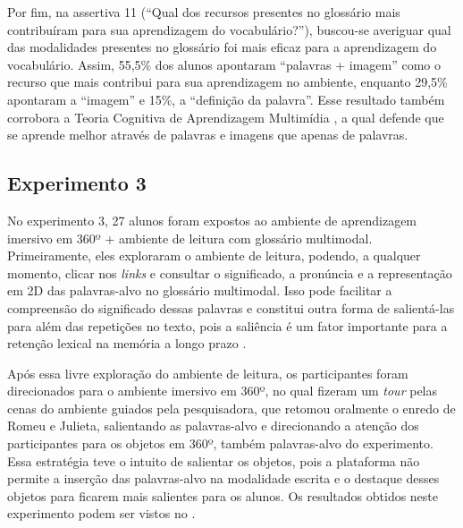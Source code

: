 Por fim, na assertiva 11 (``Qual dos recursos presentes no glossário
mais contribuíram para sua aprendizagem do vocabulário?''), buscou-se
averiguar qual das modalidades presentes no glossário foi mais eficaz
para a aprendizagem do vocabulário. Assim, 55,5\% dos alunos apontaram
``palavras + imagem'' como o recurso que mais contribui para sua
aprendizagem no ambiente, enquanto 29,5\% apontaram a ``imagem'' e 15\%,
a ``definição da palavra''. Esse resultado também corrobora a Teoria
Cognitiva de Aprendizagem Multimídia \cite{mayer2001}, a qual defende que
se aprende melhor através de palavras e imagens que apenas de palavras.

\subsection{Experimento 3}\label{sub-sec-experimento3}

No experimento 3, 27 alunos foram expostos ao ambiente de aprendizagem
imersivo em 360º + ambiente de leitura com glossário multimodal.
Primeiramente, eles exploraram o ambiente de leitura, podendo, a
qualquer momento, clicar nos \emph{links} e consultar o significado, a
pronúncia e a representação em 2D das palavras-alvo no glossário
multimodal. Isso pode facilitar a compreensão do significado dessas
palavras e constitui outra forma de salientá-las para além das
repetições no texto, pois a saliência é um fator importante para a
retenção lexical na memória a longo prazo \cite{procopio2016,saito2015}.

Após essa livre exploração do ambiente de leitura, os participantes
foram direcionados para o ambiente imersivo em 360º, no qual fizeram um
\emph{tour} pelas cenas do ambiente guiados pela pesquisadora, que
retomou oralmente o enredo de Romeu e Julieta, salientando as
palavras-alvo e direcionando a atenção dos participantes para os objetos
em 360º, também palavras-alvo do experimento. Essa estratégia teve o
intuito de salientar os objetos, pois a plataforma não permite a
inserção das palavras-alvo na modalidade escrita e o destaque desses
objetos para ficarem mais salientes para os alunos. Os resultados
obtidos neste experimento podem ser vistos no .

